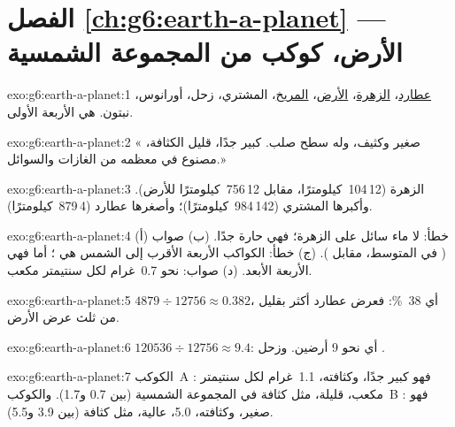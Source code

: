 \section*{الفصل \ref{ch:g6:earth-a-planet} --- الأرض، كوكب من المجموعة الشمسية}

\begin{solution}{exo:g6:earth-a-planet:1}
\underline{عطارد}، \underline{الزهرة}، \underline{الأرض}،
\underline{المريخ}، المشتري، زحل، أورانوس، نبتون.  هي
الأربعة الأولى.
\end{solution}

\begin{solution}{exo:g6:earth-a-planet:2}
« صغير وكثيف، وله سطح صلب. 
كبير جدًا، قليل الكثافة، مصنوع في معظمه من الغازات والسوائل.»
\end{solution}

\begin{solution}{exo:g6:earth-a-planet:3}
الزهرة (12\,104~كيلومترًا، مقابل 12\,756~كيلومترًا للأرض). وأكبرها
المشتري (142\,984~كيلومترًا)؛ وأصغرها عطارد (4\,879~كيلومترًا).
\end{solution}

\begin{solution}{exo:g6:earth-a-planet:4}
(أ) خطأ: لا ماء سائل على الزهرة؛ فهي حارة جدًا. (ب) صواب
( في المتوسط، مقابل ). (ج) خطأ: الكواكب
الأربعة الأقرب إلى الشمس هي ؛ أما  فهي
الأربعة الأبعد. (د) صواب: نحو 0.7~غرام لكل سنتيمتر مكعب.
\end{solution}

\begin{solution}{exo:g6:earth-a-planet:5}
$4879 \div 12756 \approx 0.382$، أي 38~\%: فعرض عطارد أكثر بقليل
من ثلث عرض الأرض.
\end{solution}

\begin{solution}{exo:g6:earth-a-planet:6}
$120536 \div 12756 \approx 9.4$: أي نحو 9 أرضين. وزحل .
\end{solution}

\begin{solution}{exo:g6:earth-a-planet:7}
الكوكب~A : فهو كبير جدًا، وكثافته، 1.1~غرام لكل
سنتيمتر مكعب، قليلة، مثل كثافة  في المجموعة الشمسية
(بين 0.7 و1.7). والكوكب~B : فهو صغير،
وكثافته، 5.0، عالية، مثل كثافة  (بين 3.9 و5.5).
\end{solution}

